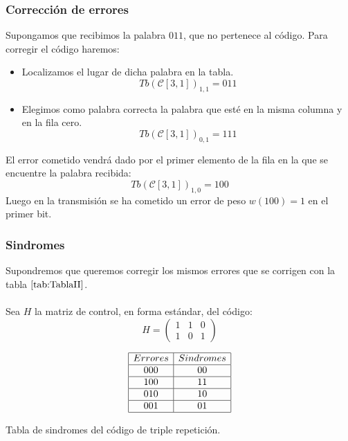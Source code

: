 \subsubsection{Correcci\'on de errores}

Supongamos que recibimos la palabra $011$, que no pertenece al c\'odigo. Para
corregir el c\'odigo haremos:
\begin{itemize}
\item Localizamos el lugar de dicha palabra en la tabla.
\begin{displaymath}
Tb(\mathcal{C}[3,1])_{1,1}=011
\end{displaymath}
\item Elegimos como palabra correcta la palabra que est\'e en la misma columna y
en la fila cero.
\begin{displaymath}
Tb(\mathcal{C}[3,1])_{0,1}=111
\end{displaymath}
\end{itemize}
El error cometido vendr\'a dado por el primer elemento de la fila en la que se
encuentre la palabra recibida:
\begin{displaymath}
Tb(\mathcal{C}[3,1])_{1,0}=100
\end{displaymath}
Luego en la transmisi\'on se ha cometido un error de peso $w(100)=1$ en el
primer bit.

\subsubsection{Sindromes}

Supondremos que queremos corregir los mismos errores que se corrigen con la
tabla $\ref{tab:TablaII}$.\\ \\
%
Sea $H$ la matriz de control, en forma est\'andar, del c\'odigo:
\begin{displaymath}
H=\left( \begin{array}{ccc}
1&1&0\\
1&0&1
\end{array} \right)
\end{displaymath}

\begin{table}[!h]
\begin{displaymath}
\begin{array}{|c|c|}
\hline
Errores & Sindromes \\
\hline
000 & 00 \\
\hline
100 & 11 \\
\hline
010 & 10 \\
\hline
001 & 01 \\
\hline
\end{array}
\end{displaymath}
\caption{Tabla de sindromes del c\'odigo de triple repetici\'on.}\label{tab:TabSindromes}
\end{table}

